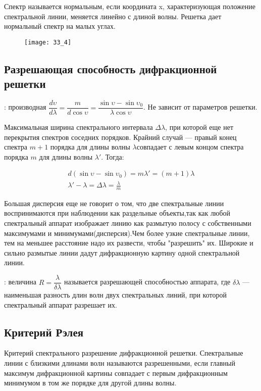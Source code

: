 Спектр называется нормальным, если координата x, характеризующая положение спектральной линии, меняется линейно с длиной волны. Решетка дает нормальный спектр на малых углах.

\begin{figure}[H]
	\centering
	\texttt{[image: 33\_4]}
\end{figure} 

\subsection{Разрешающая способность дифракционной решетки}

: производная $\dfrac{d\upsilon}{d\lambda}=\dfrac{m}{d\cos{\upsilon}}=\dfrac{\sin{\upsilon}-\sin{\upsilon_0}}{\lambda\cos{\upsilon}}$. Не зависит от параметров решетки.

 Максимальная ширина спектрального интервала $\Delta\lambda$, при которой еще нет перекрытия спектров соседних порядков. Крайний случай --- правый конец спектра $m+1$ порядка для длины волны $\lambda$совпадает с левым концом спектра порядка $m$ для длины волны $\lambda'$. Тогда:

\begin{align*}
	d(\sin{\upsilon}-\sin{\upsilon_0})=m\lambda'=(m+1)\lambda\\
	\lambda'-\lambda=\Delta\lambda=\frac{\lambda}{m}
\end{align*} 

Большая дисперсия еще не говорит о том, что две спектральные линии воспринимаются при наблюдении как раздельные объекты,так как любой спектральный аппарат изображает линию как размытую полосу с собственными максимумами и минимумами(дисперсия).Чем более узкие спектральные линии, тем на меньшее расстояние надо их развести, чтобы "разрешить" их. Широкие и сильно размытые линии дадут дифракционную картину одной спектральной линии.
 
: величина $R=\dfrac{\lambda}{\delta\lambda}$ называется разрешающей способностью аппарата, где $\delta\lambda$ --- наименьшая разность длин волн двух спектральных линий, при которой спектральный аппарат разрешает их.

\subsection{Критерий Рэлея}

Критерий спектрального разрешение дифракционной решетки. Спектральные линии с близкими длинами волн называются разрешенными, если главный максимум дифракционной картины совпадает с первым дифракционным минимумом в том же порядке для другой длины волны. 

